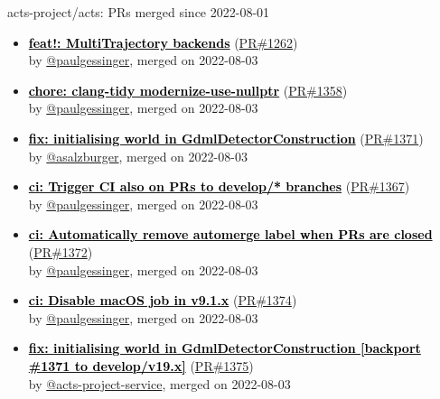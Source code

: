 \documentclass{beamer}
\begin{document}
\begin{frame}[allowframebreaks]{ acts-project/acts: PRs merged since 2022-08-01 }
\begin{itemize}
    \item
    \textbf{\href{https://github.com/acts-project/acts/pull/1262}{\textcolor{black}{feat!: MultiTrajectory backends}}}
    (\href{https://github.com/acts-project/acts/pull/1262}{PR\#1262}) \\
    by \href{https://github.com/paulgessinger}{ @paulgessinger}, merged on 2022-08-03

    \item
    \textbf{\href{https://github.com/acts-project/acts/pull/1358}{\textcolor{black}{chore: clang-tidy modernize-use-nullptr}}}
    (\href{https://github.com/acts-project/acts/pull/1358}{PR\#1358}) \\
    by \href{https://github.com/paulgessinger}{ @paulgessinger}, merged on 2022-08-03

    \item
    \textbf{\href{https://github.com/acts-project/acts/pull/1371}{\textcolor{black}{fix: initialising world in GdmlDetectorConstruction}}}
    (\href{https://github.com/acts-project/acts/pull/1371}{PR\#1371}) \\
    by \href{https://github.com/asalzburger}{ @asalzburger}, merged on 2022-08-03

    \item
    \textbf{\href{https://github.com/acts-project/acts/pull/1367}{\textcolor{black}{ci: Trigger CI also on PRs to develop/* branches}}}
    (\href{https://github.com/acts-project/acts/pull/1367}{PR\#1367}) \\
    by \href{https://github.com/paulgessinger}{ @paulgessinger}, merged on 2022-08-03

    \item
    \textbf{\href{https://github.com/acts-project/acts/pull/1372}{\textcolor{black}{ci: Automatically remove automerge label when PRs are closed}}}
    (\href{https://github.com/acts-project/acts/pull/1372}{PR\#1372}) \\
    by \href{https://github.com/paulgessinger}{ @paulgessinger}, merged on 2022-08-03

    \item
    \textbf{\href{https://github.com/acts-project/acts/pull/1374}{\textcolor{black}{ci: Disable macOS job in v9.1.x}}}
    (\href{https://github.com/acts-project/acts/pull/1374}{PR\#1374}) \\
    by \href{https://github.com/paulgessinger}{ @paulgessinger}, merged on 2022-08-03

    \item
    \textbf{\href{https://github.com/acts-project/acts/pull/1375}{\textcolor{black}{fix: initialising world in GdmlDetectorConstruction [backport \#1371 to develop/v19.x]}}}
    (\href{https://github.com/acts-project/acts/pull/1375}{PR\#1375}) \\
    by \href{https://github.com/acts-project-service}{ @acts-project-service}, merged on 2022-08-03


\end{itemize}
\end{frame}
\end{document}
